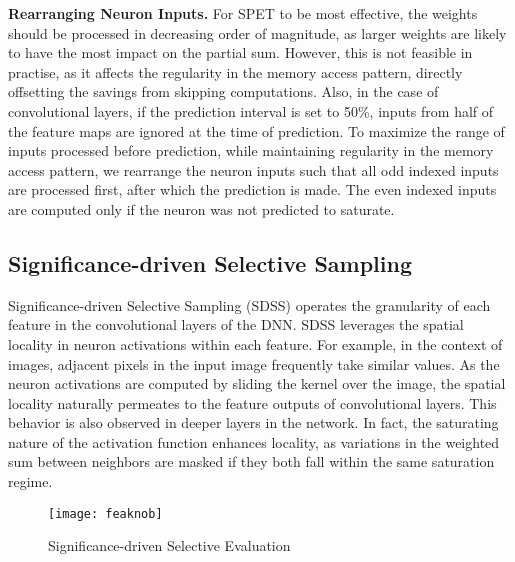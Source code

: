\documentclass{article} %
\begin{document}
{\bf \noindent Rearranging Neuron Inputs.} For SPET to be most effective, the weights should be processed in decreasing order of magnitude, as larger weights are likely to have the most impact on the partial sum. However, this is not feasible in practise, as it affects the regularity in the memory access pattern, directly offsetting the savings from skipping computations. Also, in the case of convolutional layers, if the prediction interval is set to 50\%, inputs from half of the feature maps are ignored at the time of prediction. To maximize the range of inputs processed before prediction, while maintaining regularity in the memory access pattern, we rearrange the neuron inputs such that all odd indexed inputs are processed first, after which the prediction is made. The even indexed inputs are computed only if the neuron was not predicted to saturate. %

\subsection{Significance-driven Selective Sampling}

Significance-driven Selective Sampling (SDSS) operates the granularity of each feature in the convolutional layers of the DNN. SDSS leverages the spatial locality in neuron activations within each feature. For example, in the context of images, adjacent pixels in the input image frequently take similar values. As the neuron activations are computed by sliding the kernel over the image, the spatial locality naturally permeates to the feature outputs of convolutional layers. This behavior is also observed in deeper layers in the network. In fact, the saturating nature of the activation function enhances locality, as variations in the weighted sum between neighbors are masked if they both fall within the same saturation regime. %

\begin{figure}[htb]
\begin{center}
\texttt{[image: feaknob]}
\end{center}
\caption{Significance-driven Selective Evaluation}
\label{fig:feaknob}
\end{figure}
\end{document}
